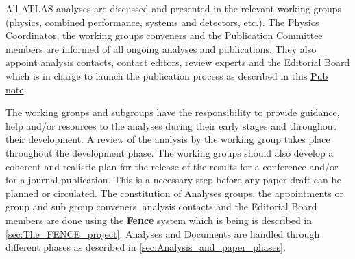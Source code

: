 All ATLAS analyses are discussed and presented in the relevant working groups  (physics, combined performance, systems and detectors, etc.). The Physics Coordinator, the working groups conveners and the Publication Committee members are informed of all ongoing analyses and publications. They also appoint analysis contacts, contact editors, review experts and the Editorial Board which is in charge to launch the publication process as described in this \href{https://cds.cern.ch/record/1980862}{Pub note}.

The working groups and subgroups have the responsibility to provide guidance, help and/or resources to the analyses during their early stages and throughout their development. A review of the analysis by the working group takes place throughout the development phase. The working groups should also develop a coherent and realistic plan for the release  of the results for a conference and/or for a journal publication. This is a necessary step before any paper draft can be planned or circulated. The constitution of Analyses groups, the appointments or group and sub group conveners, analysis contacts and the Editorial Board members are done using the\textbf{ Fence} system which is being is described in \cref{sec:The_FENCE_project}. Analyses and Documents are handled through different phases as described in \cref{sec:Analysis_and_paper_phases}.

